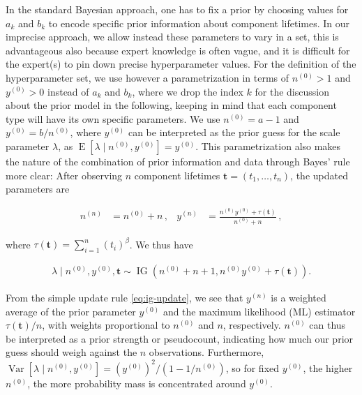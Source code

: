 \documentclass[Journal,letterpaper]{ascelike-new}
\renewcommand{\vec}[1]{{\bm#1}}
\newcommand{\uz}{^{(0)}} %
\newcommand{\un}{^{(n)}} %
\newcommand{\E}{\operatorname{E}}
\newcommand{\V}{\operatorname{Var}}
\newcommand{\ig}{\operatorname{IG}}   %
\def\yz{y\uz}
\def\yn{y\un}
\def\ykz{y\uz_k}
\def\nz{n\uz}
\def\nn{n\un}
\def\nkz{n\uz_k}
\def\taut{\tau(\vec{t})}
\begin{document}
In the standard Bayesian approach, 
one has to fix a prior by choosing values for $a_k$ and $b_k$
to encode specific prior information about component lifetimes.
In our imprecise approach, we allow instead these parameters
to vary in a set, this is advantageous also
because expert knowledge is often vague,
and it is difficult for the expert(s) to pin down precise hyperparameter values.
For the definition of the hyperparameter set,
we use however a parametrization in terms of $\nz > 1$ and $\yz > 0$ instead of $a_k$ and $b_k$,
where we drop the index $k$ for the discussion about the prior model in the following,
keeping in mind that each component type will have its own specific parameters.
We use
$\nz = a - 1$ and
$\yz = b / \nz$,
where $\yz$ can be interpreted as the prior guess for the scale parameter $\lambda$,
as $\E[\lambda\mid\nz,\yz] = \yz$.
This parametrization also makes the nature of the combination
of prior information and data through Bayes' rule more clear:
After observing $n$ component lifetimes $\vec{t} = (t_1, \ldots, t_n)$,
the updated parameters are
\begin{linenomath*}
\begin{align}
\nn &= \nz + n\,, 
&
\yn &=  \frac{\nz \yz + \taut}{\nz + n}\,,
\label{eq:ig-update}
\end{align}
\end{linenomath*}
where $\taut = \sum_{i=1}^n (t_i)^\beta$. %
We thus have
\begin{linenomath*}
\begin{align}
\lambda \mid \nz, \yz, \vec{t} \sim \ig(\nz + n + 1, \nz \yz + \taut). %
\label{eq:ig-update-alpha}
\end{align}
\end{linenomath*}
From the simple update rule \eqref{eq:ig-update}, we see that
$\yn$ is a weighted average of the prior parameter $\yz$ and the maximum likelihood (ML) estimator $\taut/n$,
with weights proportional to $\nz$ and $n$, respectively.
$\nz$ can thus be interpreted as a prior strength or pseudocount,
indicating how much our prior guess should weigh against the $n$ observations.
Furthermore, $\V[\lambda\mid\nz,\yz] = (\yz)^2 / (1 - 1/\nz)$,
so for fixed $\yz$, the higher $\nz$,
the more probability mass is concentrated around $\yz$. %
\end{document}
